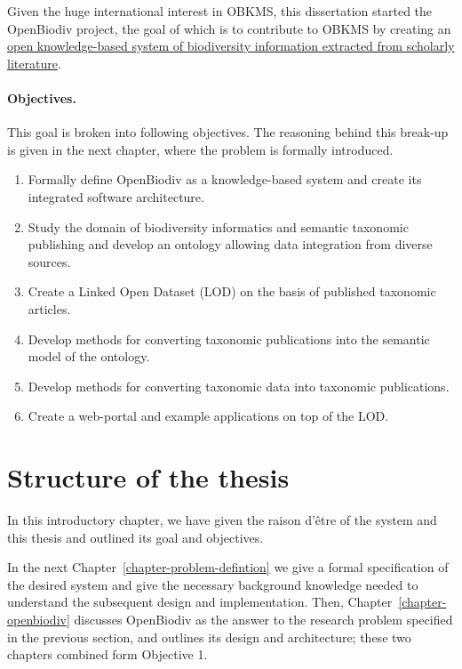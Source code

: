 {Given the huge international interest in OBKMS, this dissertation started the OpenBiodiv project, the goal of which is to contribute to OBKMS by creating an \ul{open knowledge-based system of biodiversity information extracted from scholarly literature}.

\paragraph{Objectives.} This goal is broken into following objectives. The reasoning behind this break-up is given in the next chapter, where the problem is formally introduced.

\begin{enumerate}
\item{Formally define OpenBiodiv as a knowledge-based system and create its integrated software architecture.}
\item{Study the domain of biodiversity informatics and semantic taxonomic publishing and develop an ontology allowing data integration from diverse sources.}
\item{Create a Linked Open Dataset (LOD) on the basis of published taxonomic articles.}
\item{Develop methods for converting taxonomic publications into the semantic model of the ontology.}
\item{Develop methods for converting taxonomic data into taxonomic publications.}
\item{Create a web-portal and example applications on top of the LOD.}
\end{enumerate}


\section{Structure of the thesis}

In this introductory chapter, we have given the raison d'\^etre of the system and this thesis and outlined its goal and objectives. 

In the next Chapter~\ref{chapter-problem-defintion} we give a formal specification of the desired system and give the necessary background knowledge needed to understand the subsequent design and implementation. Then, Chapter~\ref{chapter-openbiodiv} discusses OpenBiodiv as the answer to the research problem specified in the previous section, and outlines its design and architecture; these two chapters combined form Objective 1.

}

